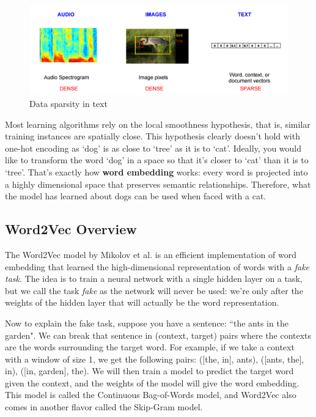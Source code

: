 \begin{figure}[H]
    \centering
    \includegraphics[width=\textwidth]{Images/comparison-text.png}
    \caption{Data sparsity in text \cite{comparison-text}}
    \label{comparison-text}
\end{figure}

Most learning algorithms rely on the local smoothness hypothesis, that is, similar training instances are spatially close. This hypothesis clearly doesn't hold with one-hot encoding as `dog' is as close to `tree' as it is to `cat'. Ideally, you would like to transform the word `dog' in a space so that it's closer to `cat' than it is to `tree'. That's exactly how \textbf{word embedding} works: every word is projected into a highly dimensional space that preserves semantic relationships. Therefore, what the model has learned about dogs can be used when faced with a cat.

\subsection{Word2Vec Overview}
The Word2Vec model by Mikolov et al. \cite{word2vec} is an efficient implementation of word embedding that learned the high-dimensional representation of words with a {\em fake task}. The idea is to train a neural network with a single hidden layer on a task, but we call the task {\em fake} as the network will never be used: we're only after the weights of the hidden layer that will actually be the word representation. 

Now to explain the fake task, suppose you have a sentence: ``the ants in the garden". We can break that sentence in (context, target) pairs where the contexts are the words surrounding the target word. For example, if we take a context with a window of size 1, we get the following pairs: ([the, in], ants), ([ants, the], in), ([in, garden], the). We will then train a model to predict the target word given the context, and the weights of the model will give the word embedding. This model is called the Continuous Bag-of-Words model, and Word2Vec also comes in another flavor called the Skip-Gram model.

